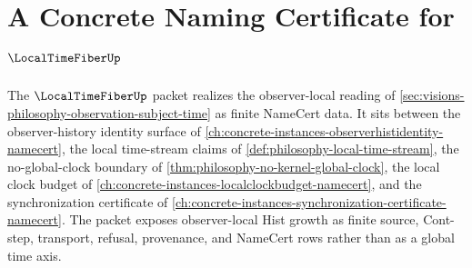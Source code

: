\chapter{A Concrete Naming Certificate for $\LocalTimeFiberUp$}
\label{ch:concrete-instances-local-time-fiber-namecert}

The $\LocalTimeFiberUp$ packet realizes the observer-local reading of \autoref{sec:visions-philosophy-observation-subject-time} as finite NameCert data. It sits between the observer-history identity surface of \autoref{ch:concrete-instances-observerhistidentity-namecert}, the local time-stream claims of \autoref{def:philosophy-local-time-stream}, the no-global-clock boundary of \autoref{thm:philosophy-no-kernel-global-clock}, the local clock budget of \autoref{ch:concrete-instances-localclockbudget-namecert}, and the synchronization certificate of \autoref{ch:concrete-instances-synchronization-certificate-namecert}. The packet exposes observer-local Hist growth as finite source, Cont-step, transport, refusal, provenance, and NameCert rows rather than as a global time axis.

